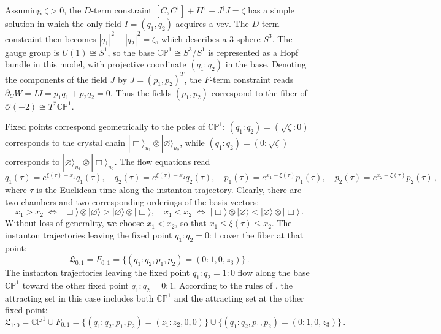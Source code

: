 \documentclass[10pt]{article}
\theoremstyle{definition}
\def\IC{\mathbb{C}}
\def\IP{\mathbb{P}}
\def\fL{\mathfrak{L}}
\numberwithin{equation}{section}
\begin{document}
Assuming $\zeta>0$, the $D$-term constraint $[C,C^\dagger]+II^\dagger-J^\dagger J=\zeta$ has a simple solution in which the only field $I=(q_1,q_2)$ acquires a vev.
The $D$-term constraint then becomes $|q_1|^2+|q_2|^2=\zeta$, which describes a $3$-sphere $S^3$.
The gauge group is $U(1)\cong S^1$, so the base $\mathbb{CP}^1\cong S^3/S^1$ is represented as a Hopf bundle in this model, with projective coordinate $(q_1:q_2)$ in the base.
Denoting the components of the field $J$ by $J=(p_1,p_2)^T$, the $F$-term constraint reads $\partial_C W=IJ=p_1q_1+p_2q_2=0$.
Thus the fields $(p_1,p_2)$ correspond to the fiber of $\mathcal{O}(-2)\cong T^*\mathbb{CP}^1$.

Fixed points correspond geometrically to the poles of $\mathbb{CP}^1$: $(q_1:q_2)=(\sqrt{\zeta}:0)$ corresponds to the crystal chain $|\Box\rangle_{u_1}\otimes|\varnothing\rangle_{u_2}$, while $(q_1:q_2)=(0:\sqrt{\zeta})$ corresponds to $|\varnothing\rangle_{u_1}\otimes|\Box\rangle_{u_2}$.
The flow equations read
\begin{equation}
	\dot q_1(\tau)=e^{\xi(\tau)-x_1}q_1(\tau),\quad \dot q_2(\tau)=e^{\xi(\tau)-x_2}q_2(\tau),\quad \dot p_1(\tau)=e^{x_1-\xi(\tau)}p_1(\tau),\quad \dot p_2(\tau)=e^{x_2-\xi(\tau)}p_2(\tau)\,,
\end{equation}
where $\tau$ is the Euclidean time along the instanton trajectory.
Clearly, there are two chambers and two corresponding orderings of the basis vectors:
\begin{equation}
	x_1>x_2\;\Longleftrightarrow \; |\Box\rangle\otimes|\varnothing\rangle>|\varnothing\rangle\otimes|\Box\rangle,\quad x_1<x_2\;\Longleftrightarrow \; |\Box\rangle\otimes|\varnothing\rangle<|\varnothing\rangle\otimes|\Box\rangle\,.
\end{equation} 
Without loss of generality, we choose $x_1<x_2$, so that $x_1\leq\xi(\tau)\leq x_2$.
The instanton trajectories leaving the fixed point $q_1:q_2=0:1$ cover the fiber at that point:
\begin{equation}
	\fL_{0:1}=F_{0:1}=\{(q_1:q_2,p_1,p_2)=(0:1,0,z_3)\}\,.
\end{equation}
The instanton trajectories leaving the fixed point $q_1:q_2=1:0$ flow along the base $\mathbb{CP}^1$ toward the other fixed point $q_1:q_2=0:1$.
According to the rules of \cite{MO}, the attracting set in this case includes both $\mathbb{CP}^1$ and the attracting set at the other fixed point:
\begin{equation}
	\fL_{1:0}=\IC\IP^1\cup F_{0:1}=\{(q_1:q_2,p_1,p_2)=(z_1:z_2,0,0)\}\cup\{(q_1:q_2,p_1,p_2)=(0:1,0,z_3)\}\,.
\end{equation}
\end{document}
